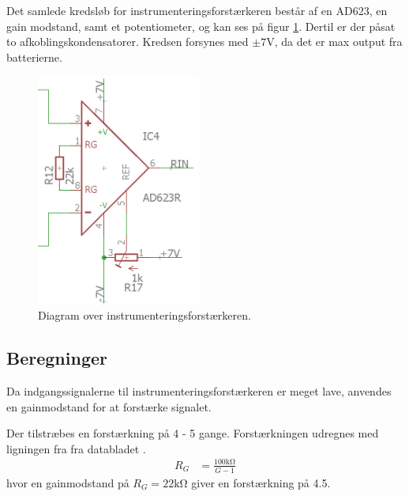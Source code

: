Det samlede kredsløb for instrumenteringsforstærkeren består af en AD623, en gain modstand, samt et potentiometer, og kan ses på figur \ref{fig:instrumentation_amplifier}. Dertil er der påsat to afkoblingskondensatorer. Kredsen forsynes med $\pm 7 \si{\volt}$, da det er max output fra batterierne. 
\begin{figure}
	\centering
	\includegraphics[width=0.48\textwidth]{billeder/instrumentation_amplifier.png}
	\caption{Diagram over instrumenteringsforstærkeren.}
	\label{fig:instrumentation_amplifier}
\end{figure}
\subsection{Beregninger}
Da indgangssignalerne til instrumenteringsforstærkeren er meget lave, anvendes en gainmodstand for at forstærke signalet.

Der tilstræbes en forstærkning på 4 - 5 gange. Forstærkningen udregnes med ligningen fra fra databladet \cite[side 11]{AD623}.
\begin{align}
	R_G & = \frac{100 \si{\kilo\ohm}}{G-1}
\end{align}
hvor en gainmodstand på $R_G = 22 \si{\kilo\ohm}$ giver en forstærkning på \num{4.5}.